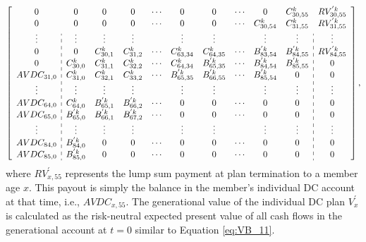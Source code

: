 \documentclass{sfuthesis}
\numberwithin{equation}{chapter}
\begin{document}
		\begin{equation}
		\label{eq:VB_14}
		\left[
		\begin{array}{c:ccccccccc:c}
		0           &0 		       &0             &0             &\cdots & 0             &0             &\cdots  &0 			&C_{30,55}^{k}  &RV_{30,55}^{'k} \\
		0           &0  	       &0 			  &0  			 &\cdots & 0 		  	 &0 			&\cdots  &C_{30,54}^{k} &C_{31,55}^{k}  &RV_{31,55}^{'k}  \\
		\vdots      &\vdots 	   &\vdots 		  &\vdots  	     &       & \vdots 	     &\vdots 	    &        &\vdots 	    &\vdots         &\vdots \\
		0           &0  		   &C_{30,1}^{k}  &C_{31,2}^{k}  &\cdots & C_{63,34}^{k} &C_{64,35}^{k} &\cdots  &B_{83,54}^{'k} &B_{84,55}^{'k}  &RV_{84,55}^{'k} \\
		0           &C_{30,0}^{k}  &C_{31,1}^{k}  &C_{32,2}^{k}  &\cdots & C_{64,34}^{k} &B_{65,35}^{'k} &\cdots  &B_{84,54}^{'k} &B_{85,55}^{'k}  &0\\
		AVDC_{31,0} &C_{31,0}^{k}  &C_{32,1}^{k}  &C_{33,2}^{k}  &\cdots & B_{65,35}^{'k} &B_{66,55}^{'k} &\cdots  &B_{85,54}^{'k} &0              &0 \\	
		\vdots      &\vdots 	   &\vdots 		  &\vdots  	     &       & \vdots 	     &\vdots 	    &        &\vdots 	    &\vdots         &\vdots  \\
		AVDC_{64,0} &C_{64,0}^{k}  &B_{65,1}^{'k}  &B_{66,2}^{'k}  &\cdots & 0 		     &0 		    &\cdots  &0 			&0              & 0 \\
		AVDC_{65,0} &B_{65,0}^{'k}  &B_{66,1}^{'k}  &B_{67,2}^{'k}  &\cdots & 0 			 &0 		    &\cdots  &0             &0              &0 \\
		\vdots      &\vdots 	   &\vdots 		  &\vdots  	     &       & \vdots 	     &\vdots 	    &        &\vdots 	    &\vdots         &\vdots  \\
		AVDC_{84,0} &B_{84,0}^{'k}  &0             &0  			 &\cdots & 0 			 &0             &\cdots  &0             &0              &0 \\
		AVDC_{85,0} &B_{85,0}^{'k}  &0             &0  			 &\cdots & 0 			 &0             &\cdots  &0             &0              &0\\
		\end{array}
		\right],
		\end{equation}
		where $RV_{x,55}^{'}$ represents the lump sum payment at plan termination to a member age $x$. This payout is simply the balance in the member's individual DC account at that time, i.e., $AVDC_{x,55}$. The generational value of the individual DC plan $V_{x}^{'}$ is calculated as the risk-neutral expected present value of all cash flows in the generational account at $t=0$ similar to Equation \eqref{eq:VB_11}.
	
\end{document}
